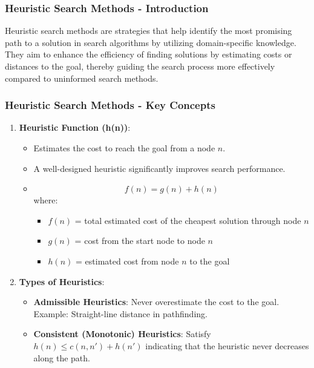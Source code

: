 \documentclass[aspectratio=169]{beamer}
\begin{document}
\begin{frame}[fragile]
    \frametitle{Heuristic Search Methods - Introduction}
    Heuristic search methods are strategies that help identify the most promising path to a solution in search algorithms by utilizing domain-specific knowledge. They aim to enhance the efficiency of finding solutions by estimating costs or distances to the goal, thereby guiding the search process more effectively compared to uninformed search methods.
\end{frame}

\begin{frame}[fragile]
    \frametitle{Heuristic Search Methods - Key Concepts}
    \begin{enumerate}
        \item \textbf{Heuristic Function (h(n))}:
            \begin{itemize}
                \item Estimates the cost to reach the goal from a node \( n \).
                \item A well-designed heuristic significantly improves search performance.
                \item \begin{equation}
                    f(n) = g(n) + h(n)
                \end{equation}
                where:
                \begin{itemize}
                    \item \( f(n) \) = total estimated cost of the cheapest solution through node \( n \)
                    \item \( g(n) \) = cost from the start node to node \( n \)
                    \item \( h(n) \) = estimated cost from node \( n \) to the goal
                \end{itemize}
            \end{itemize}

        \item \textbf{Types of Heuristics}:
            \begin{itemize}
                \item \textbf{Admissible Heuristics}: Never overestimate the cost to the goal. Example: Straight-line distance in pathfinding.
                \item \textbf{Consistent (Monotonic) Heuristics}: Satisfy \( h(n) \leq c(n, n') + h(n') \) indicating that the heuristic never decreases along the path.
            \end{itemize}
    \end{enumerate}
\end{frame}
\end{document}
